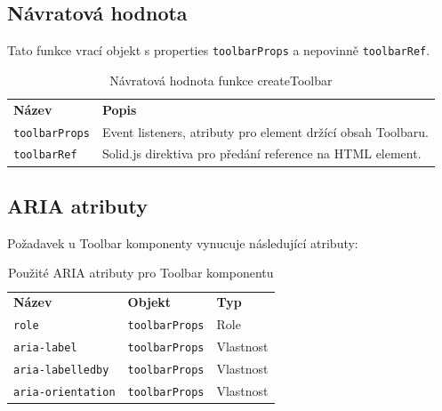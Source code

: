 \subsection{Návratová hodnota}

Tato funkce vrací objekt s properties \texttt{toolbarProps} a nepovinně \texttt{toolbarRef}.

\begin{table}[ht]\label{table:toolbar-return}
    \begin{ctucolortab}
        \begin{tabularx}{\textwidth}{p{3cm} X}
            \bfseries Název       & \bfseries Popis                                              \\\Midrule{}
            \texttt{toolbarProps} & Event listeners, atributy pro element držící obsah Toolbaru. \\
            \texttt{toolbarRef}   & Solid.js direktiva pro předání reference na HTML element.
        \end{tabularx}
    \end{ctucolortab}
    \caption{Návratová hodnota funkce createToolbar}
\end{table}

\clearpage

\subsection{ARIA atributy}

Požadavek \hyperref[ofr12]{} u Toolbar komponenty vynucuje následující atributy:

\begin{table}[ht]\label{table:toolbar-aria}
    \begin{ctucolortab}
        \begin{tabularx}{\textwidth}{X X X}
            \bfseries Název           & \bfseries Objekt      & \bfseries Typ \\\Midrule{}
            \texttt{role}             & \texttt{toolbarProps} & Role          \\
            \texttt{aria-label}       & \texttt{toolbarProps} & Vlastnost     \\
            \texttt{aria-labelledby}  & \texttt{toolbarProps} & Vlastnost     \\
            \texttt{aria-orientation} & \texttt{toolbarProps} & Vlastnost
        \end{tabularx}
    \end{ctucolortab}
    \caption{Použité ARIA atributy pro Toolbar komponentu}
\end{table}

